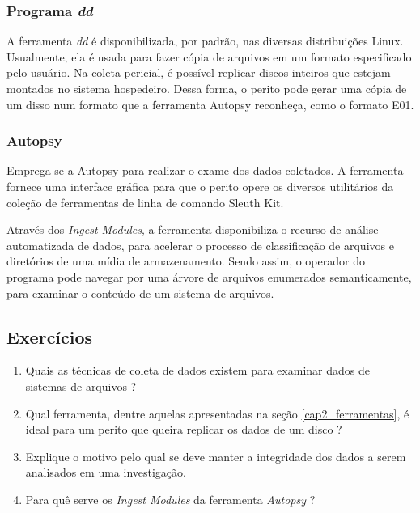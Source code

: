     \subsubsection{Programa \textit{dd}}
    
    \hspace{1cm}
    A ferramenta \textit{dd} é disponibilizada, por padrão, nas diversas distribuições Linux. Usualmente, ela é usada para fazer cópia de arquivos em um formato especificado pelo usuário. Na coleta pericial, é possível replicar discos inteiros que estejam montados no sistema hospedeiro. Dessa forma, o perito pode gerar uma cópia de um disso num formato que a ferramenta Autopsy reconheça, como o formato E01.
    
    \subsubsection{Autopsy}

    \hspace{1cm}
    Emprega-se a Autopsy para realizar o exame dos dados coletados. A ferramenta fornece uma interface gráfica para que o perito opere os diversos utilitários da coleção de ferramentas de linha de comando Sleuth Kit.
    
    \vspace{4mm}
    
    \hspace{1cm}
    Através dos \textit{Ingest Modules}, a ferramenta disponibiliza o recurso de análise automatizada de dados, para acelerar o processo de classificação de arquivos e diretórios de uma mídia de armazenamento. Sendo assim, o operador do programa pode navegar por uma árvore de arquivos enumerados semanticamente, para examinar o conteúdo de um sistema de arquivos.

    \subsection{Exercícios}
    
    \begin{example} \label{cap2_exercicios}
        \begin{enumerate}
            \item Quais as técnicas de coleta de dados existem para examinar dados de sistemas de arquivos ?
            \item Qual ferramenta, dentre aquelas apresentadas na seção \ref{cap2_ferramentas}, é ideal para um perito que queira replicar os dados de um disco ?
            \item Explique o motivo pelo qual se deve manter a integridade dos dados a serem analisados em uma investigação.
            \item Para quê serve os \textit{Ingest Modules} da ferramenta \textit{Autopsy} ?
        \end{enumerate}
    \end{example}
    
\newpage